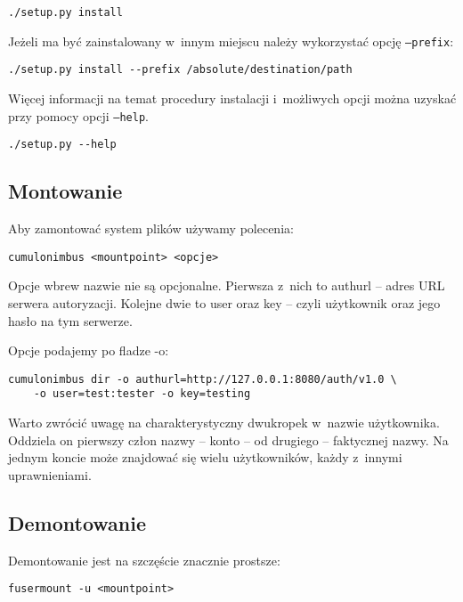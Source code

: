\begin{verbatim}
./setup.py install
\end{verbatim}

Jeżeli \cb{} ma być zainstalowany w~innym miejscu należy wykorzystać opcję
\texttt{--prefix}:

\begin{verbatim}
./setup.py install --prefix /absolute/destination/path
\end{verbatim}

Więcej informacji na temat procedury instalacji i~możliwych opcji można uzyskać
przy pomocy opcji \texttt{--help}.

\begin{verbatim}
./setup.py --help
\end{verbatim}

\subsection{Montowanie}

Aby zamontować system plików używamy polecenia:

\begin{verbatim}
cumulonimbus <mountpoint> <opcje>
\end{verbatim}

Opcje wbrew nazwie nie są opcjonalne. Pierwsza z~nich to authurl -- adres URL
serwera autoryzacji. Kolejne dwie to user oraz key -- czyli użytkownik oraz
jego hasło na tym serwerze.

Opcje podajemy po fladze -o:

\begin{verbatim}
cumulonimbus dir -o authurl=http://127.0.0.1:8080/auth/v1.0 \
    -o user=test:tester -o key=testing
\end{verbatim}

Warto zwrócić uwagę na charakterystyczny dwukropek w~nazwie użytkownika.
Oddziela on pierwszy człon nazwy -- konto -- od drugiego -- faktycznej nazwy.
Na jednym koncie może znajdować się wielu użytkowników, każdy z~innymi
uprawnieniami.

\subsection{Demontowanie}

Demontowanie jest na szczęście znacznie prostsze:

\begin{verbatim}
fusermount -u <mountpoint>
\end{verbatim}





